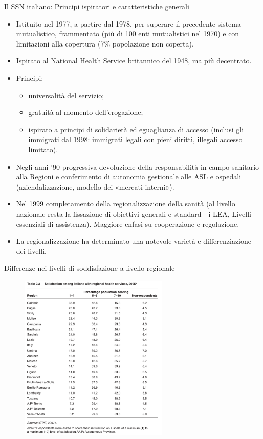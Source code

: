 \documentclass[aspectratio=64,12pt]{beamer}
\begin{document}
\begin{frame}{Il SSN italiano: Principi ispiratori e caratteristiche generali}
\begin{resize}{0.9}
\begin{itemize}
\item Istituito nel 1977, a partire dal 1978, per superare il precedente sistema
mutualistico, frammentato (più di 100 enti mutualistici nel 1970) e con
limitazioni alla copertura (7\% popolazione non coperta).
\item Ispirato al National Health Service britannico del 1948, ma più decentrato.
\item Principi:
\begin{itemize}
\item universalità del servizio;
\item gratuità al momento dell'erogazione;
\item ispirato a principi di solidarietà ed eguaglianza di accesso (inclusi gli
immigrati dal 1998: immigrati legali con pieni diritti, illegali accesso limitato).
\end{itemize}
\item Negli anni '90 progressiva devoluzione della responsabilità in campo
sanitario alla Regioni e conferimento di autonomia gestionale alle ASL e
ospedali (aziendalizzazione, modello dei «mercati interni»).
\item Nel 1999 completamento della regionalizzazione della sanità (al livello
nazionale resta la fissazione di obiettivi generali e standard---i LEA,
Livelli essenziali di assistenza). Maggiore enfasi su cooperazione e
regolazione.
\item La regionalizzazione ha determinato una notevole varietà e differenziazione
dei livelli.
\end{itemize}
\end{resize}
\end{frame}

\begin{frame}{Differenze nei livelli di soddisfazione a livello regionale}
\begin{figure}[htbp]
\centering
\includegraphics[height=8cm]{./figure/soddisfazione-sanita-italiana-regioni.pdf}
\end{figure}
\end{frame}
\end{document}
